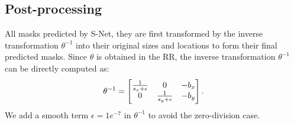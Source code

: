 \documentclass{article}
\begin{document}
\subsection{Post-processing}
\label{subsec:post-processing}
\vspace{-2pt}
All masks predicted by S-Net, they are first transformed by the inverse transformation $\theta^{-1}$ into their original sizes and locations to form their final predicted masks. Since $\theta$ is obtained in the RR, the inverse transformation $\theta^{-1}$ can be directly computed as:
\begin{equation}\vspace{-2pt}
    \theta^{-1}
    =
    \left[
    \begin{matrix}
    \frac{1}{s_x + \epsilon} & 0 & -b_x \\
    0 & \frac{1}{s_y + \epsilon} & -b_y 
    \end{matrix}
    \right].\vspace{-2pt}
\end{equation}
\noindent We add a smooth term $\epsilon=1e^{-7}$ in $\theta^{-1}$ to avoid the zero-division case.%
\end{document}

